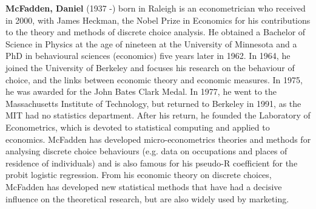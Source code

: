 \textbf{McFadden, Daniel} (1937 -) born in Raleigh is an econometrician who received in 2000, with James Heckman, the Nobel Prize in Economics for his contributions to the theory and methods of discrete choice analysis. He obtained a Bachelor of Science in Physics at the age of nineteen at the University of Minnesota and a PhD in behavioural sciences (economics) five years later in 1962. In 1964, he joined the University of Berkeley and focuses his research on the behaviour of choice, and the links between economic theory and economic measures. In 1975, he was awarded for the John Bates Clark Medal. In 1977, he went to the Massachusetts Institute of Technology, but returned to Berkeley in 1991, as the MIT had no statistics department. After his return, he founded the Laboratory of Econometrics, which is devoted to statistical computing and applied to economics. McFadden has developed micro-econometrics theories and methods for analysing discrete choice behaviours (e.g. data on occupations and places of residence of individuals) and is also famous for his pseudo-R coefficient for the probit logistic regression. From his economic theory on discrete choices, McFadden has developed new statistical methods that have had a decisive influence on the theoretical research, but are also widely used by marketing.

